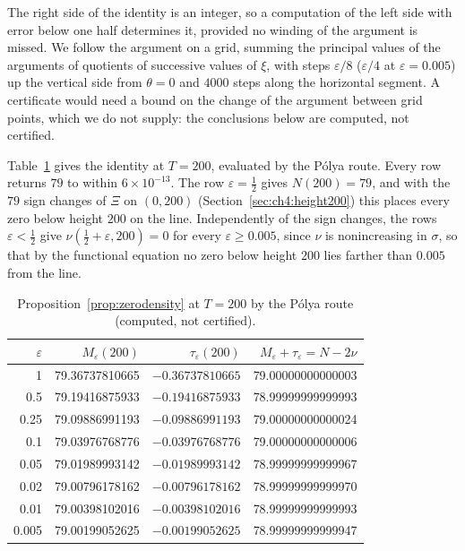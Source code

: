 The right side of the identity is an integer, so a computation of the left side with error below one half determines it, provided no winding of the argument is missed. We follow the argument on a grid, summing the principal values of the arguments of quotients of successive values of $\xi$, with steps $\varepsilon/8$ ($\varepsilon/4$ at $\varepsilon=0.005$) up the vertical side from $\theta=0$ and $4000$ steps along the horizontal segment. A certificate would need a bound on the change of the argument between grid points, which we do not supply: the conclusions below are computed, not certified.

Table~\ref{tab:zerodensity} gives the identity at $T=200$, evaluated by the P\'olya route. Every row returns $79$ to within $6\times10^{-13}$. The row $\varepsilon=\tfrac12$ gives $N(200)=79$, and with the $79$ sign changes of $\Xi$ on $(0,200)$ (Section~\ref{sec:ch4:height200}) this places every zero below height $200$ on the line. Independently of the sign changes, the rows $\varepsilon<\tfrac12$ give $\nu(\tfrac12+\varepsilon,200)=0$ for every $\varepsilon\ge0.005$, since $\nu$ is nonincreasing in $\sigma$, so that by the functional equation no zero below height $200$ lies farther than $0.005$ from the line.

\begin{table}[htbp]
\centering\small
\begin{tabular}{rrrr}
\toprule
$\varepsilon$ & $M_\varepsilon(200)$ & $\tau_\varepsilon(200)$ & $M_\varepsilon+\tau_\varepsilon=N-2\nu$\\
\midrule
1 & 79.36737810665 & $-0.36737810665$ & 79.00000000000003\\
0.5 & 79.19416875933 & $-0.19416875933$ & 78.99999999999993\\
0.25 & 79.09886991193 & $-0.09886991193$ & 79.00000000000024\\
0.1 & 79.03976768776 & $-0.03976768776$ & 79.00000000000006\\
0.05 & 79.01989993142 & $-0.01989993142$ & 78.99999999999967\\
0.02 & 79.00796178162 & $-0.00796178162$ & 78.99999999999970\\
0.01 & 79.00398102016 & $-0.00398102016$ & 78.99999999999993\\
0.005 & 79.00199052625 & $-0.00199052625$ & 78.99999999999947\\
\bottomrule
\end{tabular}
\caption{Proposition~\ref{prop:zerodensity} at $T=200$ by the P\'olya route (computed, not certified).}
\label{tab:zerodensity}
\end{table}

